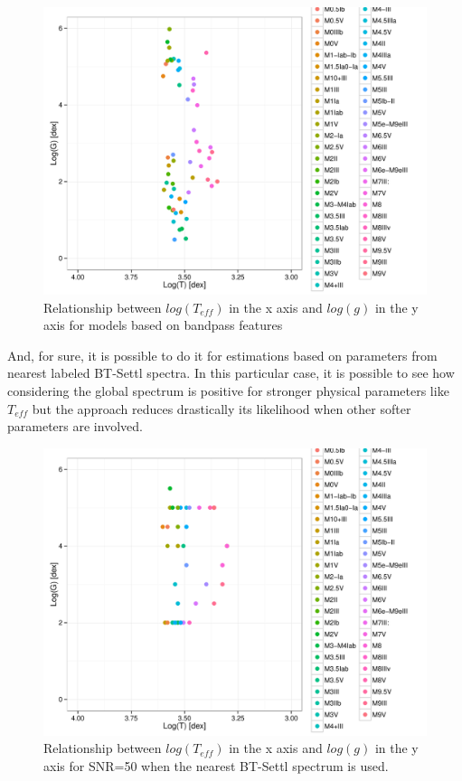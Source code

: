 \begin{figure}
 \begin{center}
 \includegraphics[width=12cm]{figs/LT_LG_ga.pdf}
 \caption{Relationship between $log(T_{eff}) $ in the x axis 
 and $log(g)$ in the y axis for models based on bandpass features }
 \label{fig:lt_lg_ga}
 \end{center}
\end{figure}

And, for sure, it is possible to do it for estimations based on 
parameters from nearest labeled BT-Settl spectra.
In this particular case, it is possible to see how 
considering the global spectrum is positive for stronger 
physical parameters like $T_{eff}$ but the approach
reduces drastically its likelihood when other softer 
parameters are involved.

\begin{figure}
 \begin{center}
 \includegraphics[width=12cm]{figs/LT_LG_chi2.pdf}
 \caption{Relationship between $log(T_{eff}) $ in the x axis 
 and $log(g)$ in the y axis for SNR=50 when 
 the nearest BT-Settl spectrum is used.}
 \label{fig:lt_lg_chi2}
 \end{center}
\end{figure}

